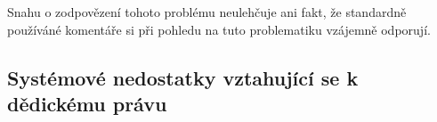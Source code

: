 \documentclass{article}
\begin{document}
Snahu o zodpovězení tohoto problému neulehčuje ani fakt, že standardně používáné komentáře si při pohledu na tuto problematiku vzájemně odporují.


\subsection{Systémové nedostatky vztahující se k dědickému právu}


\end{document}

